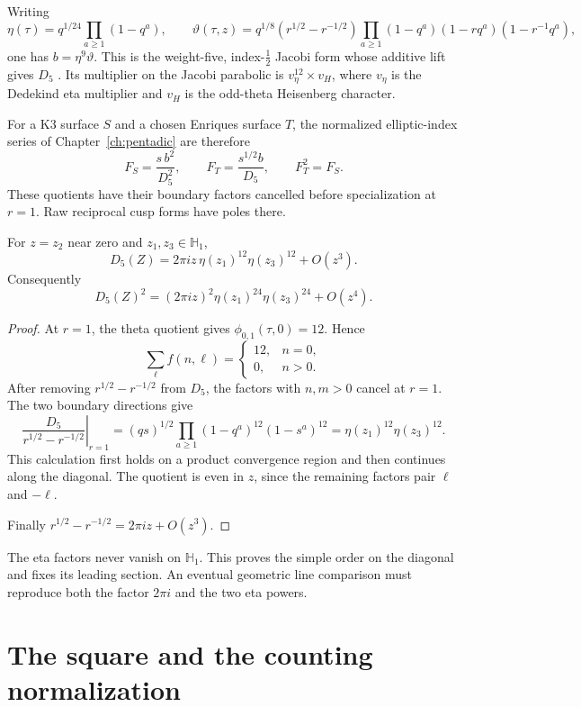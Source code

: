 Writing
\[
 \eta(\tau)=q^{1/24}\prod_{a\geq1}(1-q^a),\qquad
 \vartheta(\tau,z)=q^{1/8}(r^{1/2}-r^{-1/2})
  \prod_{a\geq1}(1-q^a)(1-rq^a)(1-r^{-1}q^a),
\]
one has \(b=\eta^9\vartheta\).
This is the weight-five, index-\(\tfrac12\) Jacobi form whose
additive lift gives \(D_5\) \cite[(13)]{GC}.
Its multiplier on the Jacobi parabolic is
\(v_\eta^{12}\times v_H\), where \(v_\eta\) is the Dedekind
eta multiplier and \(v_H\) is the odd-theta Heisenberg character.

For a K3 surface \(S\) and a chosen Enriques surface \(T\), the
normalized elliptic-index series of Chapter~\ref{ch:pentadic} are
therefore
\[
 F_S=\frac{s\,b^2}{D_5^2},\qquad
 F_T=\frac{s^{1/2}b}{D_5},\qquad F_T^2=F_S.
\]
These quotients have their boundary factors cancelled before
specialization at \(r=1\).  Raw reciprocal cusp forms have poles
there.

\begin{proposition}
\label{prop:view1-separating-leading}
For \(z=z_2\) near zero and \(z_1,z_3\in\mathbb H_1\),
\[
 D_5(Z)=2\pi iz\,\eta(z_1)^{12}\eta(z_3)^{12}+O(z^3).
\]
Consequently
\[
 D_5(Z)^2=(2\pi iz)^2\eta(z_1)^{24}\eta(z_3)^{24}+O(z^4).
\]
\end{proposition}

\begin{proof}
At \(r=1\), the theta quotient gives \(\phi_{0,1}(\tau,0)=12\).
Hence
\[
 \sum_\ell f(n,\ell)=
 \begin{cases}12,&n=0,\\0,&n>0.\end{cases}
\]
After removing \(r^{1/2}-r^{-1/2}\) from \(D_5\), the factors
with \(n,m>0\) cancel at \(r=1\).  The two boundary directions give
\[
 \left.\frac{D_5}{r^{1/2}-r^{-1/2}}\right|_{r=1}
 =(qs)^{1/2}\prod_{a\geq1}(1-q^a)^{12}(1-s^a)^{12}
 =\eta(z_1)^{12}\eta(z_3)^{12}.
\]
This calculation first holds on a product convergence region and then
continues along the diagonal.  The quotient is even in \(z\), since
the remaining factors pair \(\ell\) and \(-\ell\).

Finally \(r^{1/2}-r^{-1/2}=2\pi iz+O(z^3)\).
\end{proof}

The eta factors never vanish on \(\mathbb H_1\).
This proves the simple order on the diagonal and fixes its leading
section.  An eventual geometric line comparison must reproduce both
the factor \(2\pi i\) and the two eta powers.

\section{The square and the counting normalization}
\label{sec:view1-squared-scalar}

